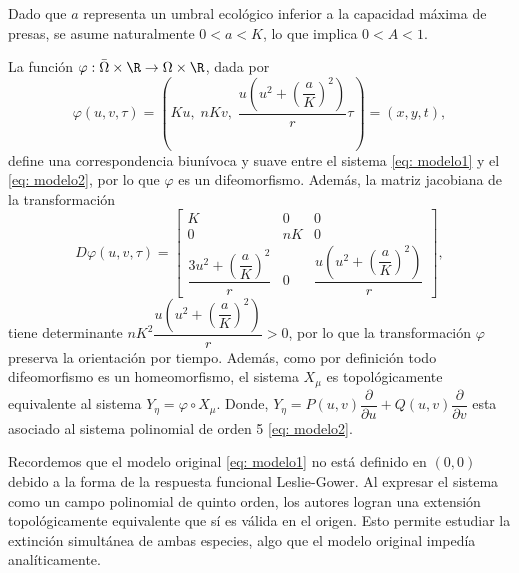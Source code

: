 {    \begin{remark}
    	Dado que $a$ representa un umbral ecológico inferior a la capacidad máxima de presas, se asume naturalmente $0<a<K$, lo que implica $0<A<1$.
    \end{remark}
    \begin{remark}
	    	La función $\varphi : \bar{\Omega} \times \R \rightarrow \Omega \times \R$, dada por
	    	\begin{equation*}
	    		\varphi(u, v, \tau) = \left( Ku, \; nKv, \; \dfrac{u\left(u^{2}+\left(\dfrac{a}{K}\right)^{2}\right)}{r} \tau \right) = (x, y, t),
	    	\end{equation*}
	    	define una correspondencia biunívoca y suave entre el sistema \eqref{eq: modelo1} y el \eqref{eq: modelo2}, por lo que $\varphi$ es un difeomorfismo. Además, la matriz jacobiana de la transformación
	    	\begin{equation}
	    		D\varphi(u, v, \tau) =
	    		\begin{bmatrix}
	    			K & 0 & 0 \\
	    			0 & nK & 0 \\
	    			\dfrac{3u^{2}+\left(\dfrac{a}{K}\right)^{2}}{r} & 0 & \dfrac{u\left(u^{2}+\left(\dfrac{a}{K}\right)^{2}\right)}{r}
	    		\end{bmatrix},
	    	\end{equation}
	    	tiene determinante $nK^{2} \dfrac{u\left(u^{2}+\left(\dfrac{a}{K}\right)^{2}\right)}{r} > 0$, por lo que la transformación $\varphi$ preserva la orientación por tiempo. Además, como por definición todo difeomorfismo es un homeomorfismo, el sistema $X_{\mu}$ es topológicamente equivalente al sistema $Y_{\eta} = \varphi \circ X_{\mu}$. Donde, $Y_{\eta} = P(u,v)\dfrac{\partial}{\partial u} + Q(u,v)\dfrac{\partial}{\partial v}$ esta asociado al sistema polinomial de orden 5 \eqref{eq: modelo2}.
    \end{remark}
    
    Recordemos que el modelo original \eqref{eq: modelo1} no está definido en $(0,0)$ debido a la forma de la respuesta funcional Leslie-Gower. Al expresar el sistema como un campo polinomial de quinto orden, los autores logran una extensión topológicamente equivalente que sí es válida en el origen. Esto permite estudiar la extinción simultánea de ambas especies, algo que el modelo original impedía analíticamente.
    
}
